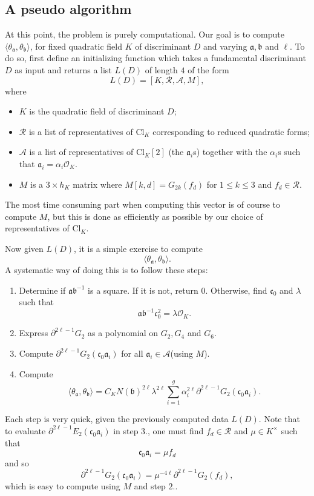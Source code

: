\documentclass[twoside,10pt]{article}
\newcommand{\ida}{\mathfrak{a}}
\newcommand{\idb}{\mathfrak{b}}
\newcommand{\idc}{\mathfrak{c}}
\newcommand{\del}{\partial}
\newcommand{\Clk}{\text{Cl}_K}
\renewcommand{\O}{\mathcal{O}}
\newcommand{\tida}{\theta_\mathfrak{a}}
\begin{document}
\subsection{A pseudo algorithm}
At this point, the problem is purely computational. Our goal is to compute
$\langle\tida,\theta_\idb\rangle$,
for fixed quadratic field $K$ of discriminant $D$ and varying $\ida,\idb$ and $\ell$. To do so, first define an initializing function which takes a fundamental discriminant $D$ as input and returns a list $L(D)$ of length $4$ of the form
\[L(D)=[K,\mathcal{R},\mathcal{A},M],\]
where
\begin{itemize}
	\item $K$ is the quadratic field of discriminant $D$;
	\item $\mathcal{R}$ is a list of representatives of $\Clk$ corresponding to reduced quadratic forms;
	\item $\mathcal{A}$ is a list of representatives of $\Clk[2]$ (the $\ida_i$s) together with the $\alpha_i$s such that $\ida_i=\alpha_i\O_K$.
	\item $M$ is a $3\times h_K$ matrix where $M[k,d]=G_{2k}(f_d)$ for $1\leq k\leq 3$ and $f_d\in\mathcal{R}$.
\end{itemize}

The most time consuming part when computing this vector is of course to compute $M$, but this is done as efficiently as possible by our choice of representatives of $\Clk$.

Now given $L(D)$, it is a simple exercise to compute
\[\langle\tida,\theta_\idb\rangle.\]
A systematic way of doing this is to follow these steps:

\begin{enumerate}
	\item Determine if $\ida\idb^{-1}$ is a square. If it is not, return $0$. Otherwise, find  $\idc_0$ and $\lambda$ such that
	\[\ida\idb^{-1}\idc_0^2=\lambda\O_K.\]
	\item Express $\del^{2\ell-1}G_2$ as a polynomial on $G_2,G_4$ and $G_6$.
	\item Compute $\del^{2\ell-1}G_2(\idc_0\ida_i)$ for all $\ida_i\in\mathcal{A}$(using $M$).
	\item Compute
	\[\langle\tida,\theta_\idb\rangle=C_K N(\idb)^{2\ell}\lambda^{2\ell}\sum_{i=1}^g\alpha_i^{2\ell}\del^{2\ell-1}G_2(\idc_0\ida_i).\]
\end{enumerate}

Each step is very quick, given the previously computed data $L(D)$. Note that to evaluate $\del^{2\ell-1}E_2(\idc_0\ida_i)$ in step $3.$, one must find $f_d\in\mathcal{R}$ and $\mu\in K^\times$ such that
\[\idc_0\ida_i=\mu f_d\]
and so
\[\del^{2\ell-1}G_2(\idc_0\ida_i)=\mu^{-4\ell}\del^{2\ell-1}G_2(f_d),\]
which is easy to compute using $M$ and step $2.$.
\end{document}
